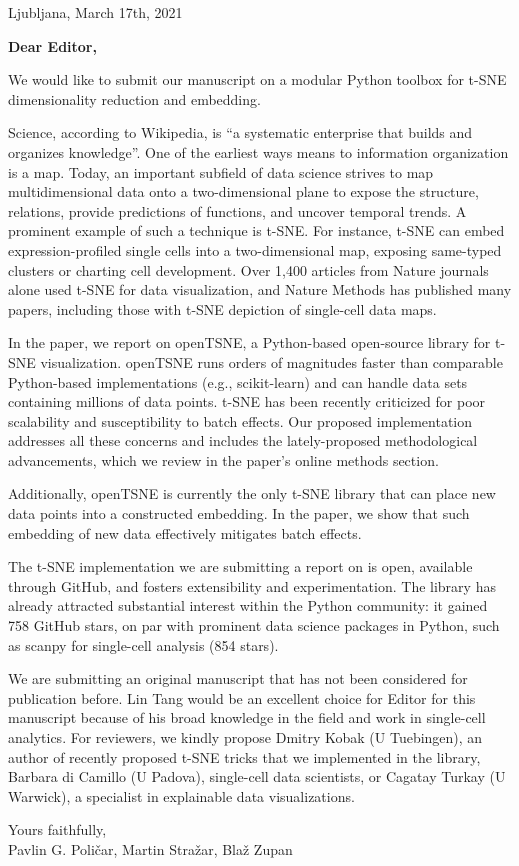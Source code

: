 \documentclass[11pt]{article}
\begin{document}
\begin{flushright}
Ljubljana, March 17th, 2021
\end{flushright}

\begin{flushleft}
{\bf Dear Editor,}

We would like to submit our manuscript on a modular Python toolbox for t-SNE dimensionality reduction and embedding.

Science, according to Wikipedia, is ``a systematic enterprise that builds and organizes knowledge''. One of the earliest ways means to information organization is a map. Today, an important subfield of data science strives to map multidimensional data onto a two-dimensional plane to expose the structure, relations, provide predictions of functions, and uncover temporal trends. A prominent example of such a technique is t-SNE. For instance, t-SNE can embed expression-profiled single cells into a two-dimensional map, exposing same-typed clusters or charting cell development. Over 1,400 articles from Nature journals alone used t-SNE for data visualization, and Nature Methods has published many papers, including those with t-SNE depiction of single-cell data maps.

In the paper, we report on openTSNE, a Python-based open-source library for t-SNE visualization. openTSNE runs orders of magnitudes faster than comparable Python-based implementations (e.g., scikit-learn) and can handle data sets containing millions of data points. t-SNE has been recently criticized for poor scalability and susceptibility to batch effects. Our proposed implementation addresses all these concerns and includes the lately-proposed methodological advancements, which we review in the paper's online methods section.

Additionally, openTSNE is currently the only t-SNE library that can place new data points into a constructed embedding. In the paper, we show that such embedding of new data effectively mitigates batch effects.

The t-SNE implementation we are submitting a report on is open, available through GitHub, and fosters extensibility and experimentation. The library has already attracted substantial interest within the Python community: it gained 758 GitHub stars, on par with prominent data science packages in Python, such as scanpy for single-cell analysis (854 stars).

We are submitting an original manuscript that has not been considered for publication before. Lin Tang would be an excellent choice for Editor for this manuscript because of his broad knowledge in the field and work in single-cell analytics. For reviewers, we kindly propose Dmitry Kobak (U Tuebingen), an author of recently proposed t-SNE tricks that we implemented in the library, Barbara di Camillo (U Padova), single-cell data scientists, or Cagatay Turkay (U Warwick), a specialist in explainable data visualizations. 

Yours faithfully, \\
Pavlin G. Poličar, Martin Stražar, Blaž Zupan
\end{flushleft}
\end{document}
